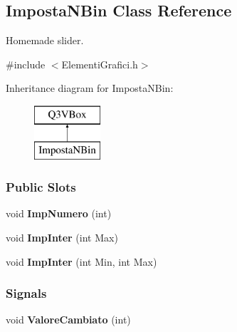 \hypertarget{classImpostaNBin}{}\subsection{Imposta\+N\+Bin Class Reference}
\label{classImpostaNBin}


Homemade slider.  




{\ttfamily \#include $<$Elementi\+Grafici.\+h$>$}

Inheritance diagram for Imposta\+N\+Bin\+:\begin{figure}[H]
\begin{center}
\leavevmode
\includegraphics[height=2.000000cm]{classImpostaNBin}
\end{center}
\end{figure}
\subsubsection*{Public Slots}
\begin{DoxyCompactItemize}
\item 
void {\bfseries Imp\+Numero} (int)\hypertarget{classImpostaNBin_a8061b6fff22eaa38700407bbf179a1ee}{}\label{classImpostaNBin_a8061b6fff22eaa38700407bbf179a1ee}

\item 
void {\bfseries Imp\+Inter} (int Max)\hypertarget{classImpostaNBin_afe52cab0e5d5fcb1ddddac6c1a10b38d}{}\label{classImpostaNBin_afe52cab0e5d5fcb1ddddac6c1a10b38d}

\item 
void {\bfseries Imp\+Inter} (int Min, int Max)\hypertarget{classImpostaNBin_a12904a8b0fbd7774c00bbcf44f6ff2f9}{}\label{classImpostaNBin_a12904a8b0fbd7774c00bbcf44f6ff2f9}

\end{DoxyCompactItemize}
\subsubsection*{Signals}
\begin{DoxyCompactItemize}
\item 
void {\bfseries Valore\+Cambiato} (int)\hypertarget{classImpostaNBin_ab1b323d7b5663b9acd07ac738d49f707}{}\label{classImpostaNBin_ab1b323d7b5663b9acd07ac738d49f707}

\end{DoxyCompactItemize}
